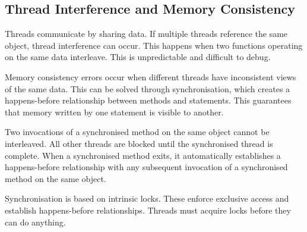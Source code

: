 {\subsection{Thread Interference and Memory Consistency}
Threads communicate by sharing data.
If multiple threads reference the same object, thread interference can occur.
This happens when two functions operating on the same data interleave.
This is unpredictable and difficult to debug.

Memory consistency errors occur when different threads have inconsistent views of the same data.
This can be solved through synchronisation, which creates a happens-before relationship between methods and statements.
This guarantees that memory written by one statement is visible to another.

Two invocations of a synchronised method on the same object cannot be interleaved.
All other threads are blocked until the synchronised thread is complete.
When a synchronised method exits, it automatically establishes a happens-before relationship with any subsequent invocation of a synchronised method on the same object.

Synchronisation is based on intrinsic locks.
These enforce exclusive access and establish happens-before relationships.
Threads must acquire locks before they can do anything.
}